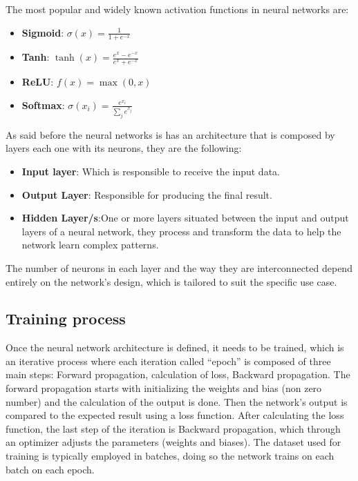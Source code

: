 The most popular and widely known activation functions in neural networks are:
\begin{itemize}
    \item \textbf{Sigmoid}: \( \sigma(x) = \frac{1}{1 + e^{-x}} \)
    \item \textbf{Tanh}: \( \tanh(x) = \frac{e^x - e^{-x}}{e^x + e^{-x}} \)
    \item \textbf{ReLU}: \( f(x) = \max(0, x) \)
    \item \textbf{Softmax}: \( \sigma(x_i) = \frac{e^{x_i}}{\sum_{j} e^{x_j}} \)
\end{itemize}

As said before the neural networks is has an architecture that is composed by layers each one with its neurons, they are the following:

\begin{itemize}
    \item \textbf{Input layer}: Which is responsible to receive the input data.
    \item \textbf{Output Layer}: Responsible for producing the final result.
    \item \textbf{Hidden Layer/s}:One or more layers situated between the input and output layers of a neural network, they process and transform the data to help the network learn complex patterns.
\end{itemize}
The number of neurons in each layer and the way they are interconnected depend entirely on the network's design, which is tailored to suit the specific use case.
\subsection{Training process}
Once the neural network architecture is defined, it needs to be trained, which is an iterative process where each iteration called “epoch” is composed of three main steps: Forward propagation, calculation of loss, Backward propagation. The forward propagation starts with initializing the weights and bias (non zero number) and the calculation of the output is done. Then the network's output is compared to the expected result using a loss function. After calculating the loss function, the last step of the iteration is Backward propagation, which through an optimizer adjusts the parameters (weights and biases). The dataset used for training is typically employed in batches, doing so the network trains on each batch on each epoch.


